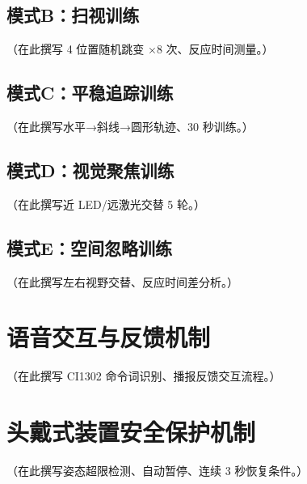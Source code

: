 \subsection{模式B：扫视训练}
（在此撰写 4 位置随机跳变 ×8 次、反应时间测量。）
\subsection{模式C：平稳追踪训练}
（在此撰写水平→斜线→圆形轨迹、30 秒训练。）
\subsection{模式D：视觉聚焦训练}
（在此撰写近 LED/远激光交替 5 轮。）
\subsection{模式E：空间忽略训练}
（在此撰写左右视野交替、反应时间差分析。）

\section{语音交互与反馈机制}
（在此撰写 CI1302 命令词识别、播报反馈交互流程。）

\section{头戴式装置安全保护机制}
（在此撰写姿态超限检测、自动暂停、连续 3 秒恢复条件。）
